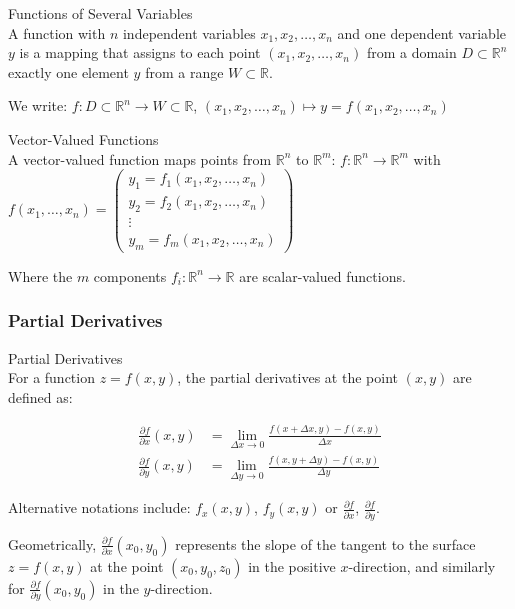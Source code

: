 \begin{definition}{Functions of Several Variables}\\
A function with $n$ independent variables $x_1, x_2, \ldots, x_n$ and one dependent variable $y$ is a mapping that assigns to each point $(x_1, x_2, \ldots, x_n)$ from a domain $D \subset \mathbb{R}^n$ exactly one element $y$ from a range $W \subset \mathbb{R}$.

We write: $f: D \subset \mathbb{R}^n \rightarrow W \subset \mathbb{R}$, $(x_1, x_2, \ldots, x_n) \mapsto y = f(x_1, x_2, \ldots, x_n)$
\end{definition}

\begin{definition}{Vector-Valued Functions}\\
A vector-valued function maps points from $\mathbb{R}^n$ to $\mathbb{R}^m$:
$f: \mathbb{R}^n \rightarrow \mathbb{R}^m$ with
$f(x_1, \ldots, x_n) = \begin{pmatrix} y_1 = f_1(x_1, x_2, \ldots, x_n) \\ y_2 = f_2(x_1, x_2, \ldots, x_n) \\ \vdots \\ y_m = f_m(x_1, x_2, \ldots, x_n) \end{pmatrix}$

Where the $m$ components $f_i: \mathbb{R}^n \rightarrow \mathbb{R}$ are scalar-valued functions.
\end{definition}

\subsubsection{Partial Derivatives}

\begin{definition}{Partial Derivatives}\\
For a function $z = f(x,y)$, the partial derivatives at the point $(x,y)$ are defined as:

\begin{align*}
\frac{\partial f}{\partial x}(x,y) &= \lim_{\Delta x \rightarrow 0} \frac{f(x+\Delta x, y) - f(x,y)}{\Delta x}\\
\frac{\partial f}{\partial y}(x,y) &= \lim_{\Delta y \rightarrow 0} \frac{f(x, y+\Delta y) - f(x,y)}{\Delta y}
\end{align*}

Alternative notations include: $f_x(x,y)$, $f_y(x,y)$ or $\frac{\partial f}{\partial x}$, $\frac{\partial f}{\partial y}$.

Geometrically, $\frac{\partial f}{\partial x}(x_0, y_0)$ represents the slope of the tangent to the surface $z=f(x,y)$ at the point $(x_0, y_0, z_0)$ in the positive $x$-direction, and similarly for $\frac{\partial f}{\partial y}(x_0, y_0)$ in the $y$-direction.
\end{definition}

